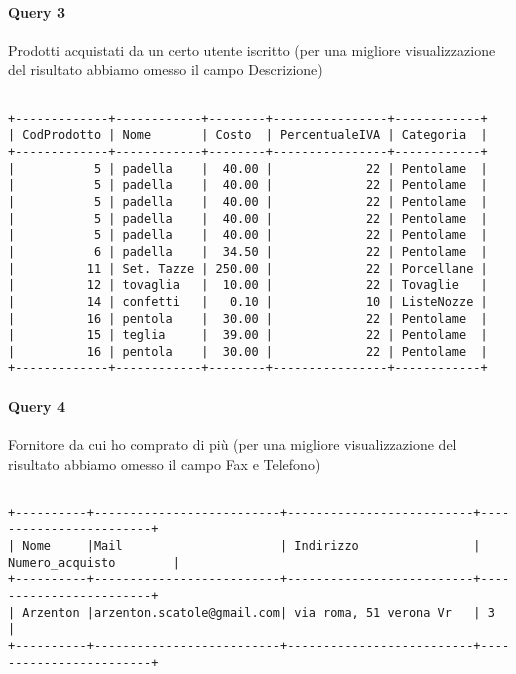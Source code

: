 \paragraph*{Query 3}
Prodotti acquistati da un certo utente iscritto (per una migliore visualizzazione del risultato abbiamo omesso il campo Descrizione)

\begin{verbatim}

+-------------+------------+--------+----------------+------------+
| CodProdotto | Nome       | Costo  | PercentualeIVA | Categoria  |
+-------------+------------+--------+----------------+------------+
|           5 | padella    |  40.00 |             22 | Pentolame  |
|           5 | padella    |  40.00 |             22 | Pentolame  |
|           5 | padella    |  40.00 |             22 | Pentolame  |
|           5 | padella    |  40.00 |             22 | Pentolame  |
|           5 | padella    |  40.00 |             22 | Pentolame  |
|           6 | padella    |  34.50 |             22 | Pentolame  |
|          11 | Set. Tazze | 250.00 |             22 | Porcellane |
|          12 | tovaglia   |  10.00 |             22 | Tovaglie   |
|          14 | confetti   |   0.10 |             10 | ListeNozze |
|          16 | pentola    |  30.00 |             22 | Pentolame  |
|          15 | teglia     |  39.00 |             22 | Pentolame  |
|          16 | pentola    |  30.00 |             22 | Pentolame  |
+-------------+------------+--------+----------------+------------+

\end{verbatim}



\paragraph*{Query 4}
Fornitore da cui ho comprato di pi\`u (per una migliore visualizzazione del risultato abbiamo omesso il campo Fax e Telefono)

\begin{verbatim}

+----------+--------------------------+--------------------------+------------------------+
| Nome     |Mail                      | Indirizzo                | Numero_acquisto        |
+----------+--------------------------+--------------------------+------------------------+
| Arzenton |arzenton.scatole@gmail.com| via roma, 51 verona Vr   | 3                      |
+----------+--------------------------+--------------------------+------------------------+

\end{verbatim}

